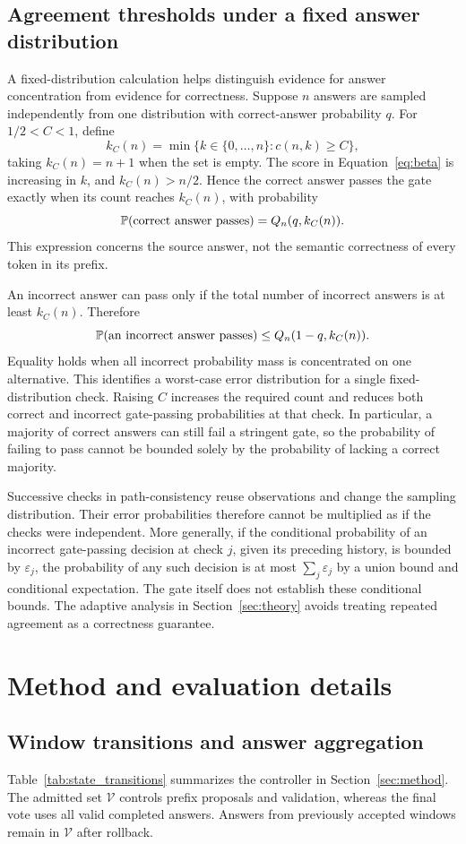 \subsection{Agreement thresholds under a fixed answer distribution}
\label{app:gate_analysis}
A fixed-distribution calculation helps distinguish evidence for answer concentration from evidence for correctness. Suppose $n$ answers are sampled independently from one distribution with correct-answer probability $q$. For $1/2<C<1$, define
\[
 k_C(n)=\min\{k\in\{0,\ldots,n\}:c(n,k)\geq C\},
\]
taking $k_C(n)=n+1$ when the set is empty. The score in Equation~\ref{eq:beta} is increasing in $k$, and $k_C(n)>n/2$. Hence the correct answer passes the gate exactly when its count reaches $k_C(n)$, with probability
\[
 \mathbb{P}(\text{correct answer passes})=Q_n(q,k_C(n)).
\]
This expression concerns the source answer, not the semantic correctness of every token in its prefix.

An incorrect answer can pass only if the total number of incorrect answers is at least $k_C(n)$. Therefore
\[
 \mathbb{P}(\text{an incorrect answer passes})
 \leq Q_n(1-q,k_C(n)).
\]
Equality holds when all incorrect probability mass is concentrated on one alternative. This identifies a worst-case error distribution for a single fixed-distribution check. Raising $C$ increases the required count and reduces both correct and incorrect gate-passing probabilities at that check. In particular, a majority of correct answers can still fail a stringent gate, so the probability of failing to pass cannot be bounded solely by the probability of lacking a correct majority.

Successive checks in path-consistency reuse observations and change the sampling distribution. Their error probabilities therefore cannot be multiplied as if the checks were independent. More generally, if the conditional probability of an incorrect gate-passing decision at check $j$, given its preceding history, is bounded by $\varepsilon_j$, the probability of any such decision is at most $\sum_j\varepsilon_j$ by a union bound and conditional expectation. The gate itself does not establish these conditional bounds. The adaptive analysis in Section~\ref{sec:theory} avoids treating repeated agreement as a correctness guarantee.

\section{Method and evaluation details}
\label{app:algorithm}
\label{app:protocol}
\subsection{Window transitions and answer aggregation}
Table~\ref{tab:state_transitions} summarizes the controller in Section~\ref{sec:method}. The admitted set $\mathcal V$ controls prefix proposals and validation, whereas the final vote uses all valid completed answers. Answers from previously accepted windows remain in $\mathcal V$ after rollback.

